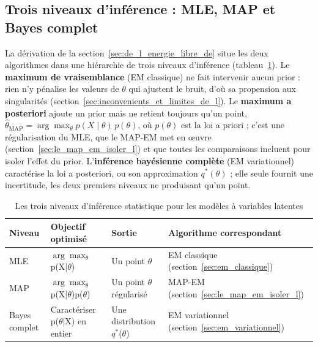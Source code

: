 \subsection{Trois niveaux d'inférence : MLE, MAP et Bayes complet}\label{sec:trois_niveaux_d_inference_mle}
La dérivation de la section~\ref{sec:de_l_energie_libre_de} situe les deux algorithmes dans une hiérarchie de trois niveaux d'inférence (tableau~\ref{tab:2_2}). Le \textbf{maximum de vraisemblance} (EM classique) ne fait intervenir aucun prior : rien n'y pénalise les valeurs de $\theta $ qui ajustent le bruit, d'où sa propension aux singularités (section~\ref{sec:inconvenients_et_limites_de_l}). Le \textbf{maximum a posteriori} ajoute un prior mais ne retient toujours qu'un point, $\hat{\theta}_{\text{MAP}} = \arg\max_{\theta} p(X \mid \theta)\,p(\theta)$, où $p(\theta)$ est la loi a priori ; c'est une régularisation du MLE, que le MAP-EM met en œuvre (section~\ref{sec:le_map_em_isoler_l}) et que toutes les comparaisons incluent pour isoler l'effet du prior. L'\textbf{inférence bayésienne complète} (EM variationnel) caractérise la loi a posteriori, ou son approximation $q^{*}(\theta)$ ; elle seule fournit une incertitude, les deux premiers niveaux ne produisant qu'un point.

\begin{table}[H]
\centering
\small
\setlength{\tabcolsep}{0.14cm}
\begin{tabular}{|p{3.54cm}|p{3.54cm}|p{3.54cm}|p{3.54cm}|}
\hline
\textbf{Niveau} & \textbf{Objectif optimisé} & \textbf{Sortie} & \textbf{Algorithme correspondant} \\
\hline
MLE & $\arg\max_{\theta}$ p(X|$\theta $) & Un point $\hat{\theta }$ & EM classique (section~\ref{sec:em_classique}) \\
\hline
MAP & $\arg\max_{\theta}$ p(X|$\theta $)p($\theta $) & Un point $\hat{\theta }$ régularisé & MAP-EM (section~\ref{sec:le_map_em_isoler_l}) \\
\hline
Bayes complet & Caractériser p($\theta $|X) en entier & Une distribution $q^{*}$($\theta $) & EM variationnel (section~\ref{sec:em_variationnel}) \\
\hline
\end{tabular}
\caption{Les trois niveaux d'inférence statistique pour les modèles à variables latentes}
\label{tab:2_2}
\end{table}
